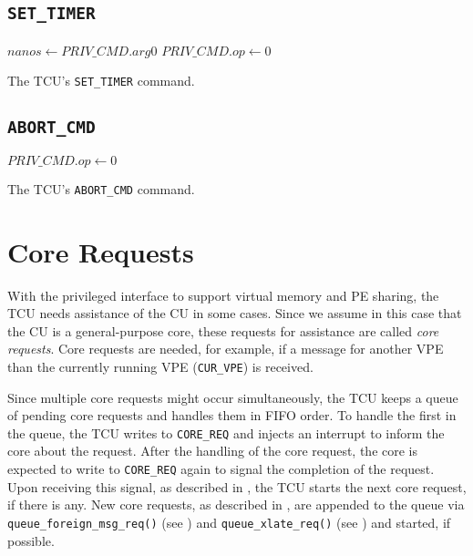\subsection{\texttt{SET\_TIMER}}

\begin{algorithm}[H]
    $nanos \gets PRIV\_CMD.arg0$\;
    \BlankLine
    $PRIV\_CMD.op \gets 0$\;
    \caption{The TCU's \texttt{SET\_TIMER} command.}
\end{algorithm}

\subsection{\texttt{ABORT\_CMD}}

\begin{algorithm}[H]
    \BlankLine
    $PRIV\_CMD.op \gets 0$\;
    \caption{The TCU's \texttt{ABORT\_CMD} command.}
\end{algorithm}
\extend{}

\section{Core Requests}

With the privileged interface to support virtual memory and PE sharing, the TCU needs assistance of
the CU in some cases. Since we assume in this case that the CU is a general-purpose core, these
requests for assistance are called \emph{core requests}. Core requests are needed, for example, if a
message for another VPE than the currently running VPE (\texttt{CUR\_VPE}) is received.

Since multiple core requests might occur simultaneously, the TCU keeps a queue of pending core
requests and handles them in FIFO order. To handle the first in the queue, the TCU writes to
\texttt{CORE\_REQ} and injects an interrupt to inform the core about the request. After the handling
of the core request, the core is expected to write to \texttt{CORE\_REQ} again to signal the
completion of the request. Upon receiving this signal, as described in ,
the TCU starts the next core request, if there is any. New core requests, as described in
, are appended to the queue via \texttt{queue\_foreign\_msg\_req()} (see
) and \texttt{queue\_xlate\_req()} (see ) and started,
if possible.


